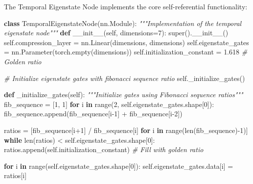 \documentclass[
]{article}
\newenvironment{Shaded}{}{}
\newcommand{\BuiltInTok}[1]{\textcolor[rgb]{0.00,0.50,0.00}{#1}}
\newcommand{\CommentTok}[1]{\textcolor[rgb]{0.38,0.63,0.69}{\textit{#1}}}
\newcommand{\ControlFlowTok}[1]{\textcolor[rgb]{0.00,0.44,0.13}{\textbf{#1}}}
\newcommand{\DecValTok}[1]{\textcolor[rgb]{0.25,0.63,0.44}{#1}}
\newcommand{\FloatTok}[1]{\textcolor[rgb]{0.25,0.63,0.44}{#1}}
\newcommand{\FunctionTok}[1]{\textcolor[rgb]{0.02,0.16,0.49}{#1}}
\newcommand{\KeywordTok}[1]{\textcolor[rgb]{0.00,0.44,0.13}{\textbf{#1}}}
\newcommand{\NormalTok}[1]{#1}
\newcommand{\OperatorTok}[1]{\textcolor[rgb]{0.40,0.40,0.40}{#1}}
\newcommand{\VariableTok}[1]{\textcolor[rgb]{0.10,0.09,0.49}{#1}}
\begin{document}
The Temporal Eigenstate Node implements the core self-referential
functionality:

\begin{Shaded}
\begin{Highlighting}[]
\KeywordTok{class}\NormalTok{ TemporalEigenstateNode(nn.Module):}
    \CommentTok{"""Implementation of the temporal eigenstate node"""}
    \KeywordTok{def} \FunctionTok{\_\_init\_\_}\NormalTok{(}\VariableTok{self}\NormalTok{, dimensions}\OperatorTok{=}\DecValTok{7}\NormalTok{):}
        \BuiltInTok{super}\NormalTok{().}\FunctionTok{\_\_init\_\_}\NormalTok{()}
        \VariableTok{self}\NormalTok{.compression\_layer }\OperatorTok{=}\NormalTok{ nn.Linear(dimensions, dimensions)}
        \VariableTok{self}\NormalTok{.eigenstate\_gates }\OperatorTok{=}\NormalTok{ nn.Parameter(torch.empty(dimensions))}
        \VariableTok{self}\NormalTok{.initialization\_constant }\OperatorTok{=} \FloatTok{1.618}  \CommentTok{\# Golden ratio}

        \CommentTok{\# Initialize eigenstate gates with fibonacci sequence ratio}
        \VariableTok{self}\NormalTok{.\_initialize\_gates()}

    \KeywordTok{def}\NormalTok{ \_initialize\_gates(}\VariableTok{self}\NormalTok{):}
        \CommentTok{"""Initialize gates using Fibonacci sequence ratios"""}
\NormalTok{        fib\_sequence }\OperatorTok{=}\NormalTok{ [}\DecValTok{1}\NormalTok{, }\DecValTok{1}\NormalTok{]}
        \ControlFlowTok{for}\NormalTok{ i }\KeywordTok{in} \BuiltInTok{range}\NormalTok{(}\DecValTok{2}\NormalTok{, }\VariableTok{self}\NormalTok{.eigenstate\_gates.shape[}\DecValTok{0}\NormalTok{]):}
\NormalTok{            fib\_sequence.append(fib\_sequence[i}\OperatorTok{{-}}\DecValTok{1}\NormalTok{] }\OperatorTok{+}\NormalTok{ fib\_sequence[i}\OperatorTok{{-}}\DecValTok{2}\NormalTok{])}

\NormalTok{        ratios }\OperatorTok{=}\NormalTok{ [fib\_sequence[i}\OperatorTok{+}\DecValTok{1}\NormalTok{] }\OperatorTok{/}\NormalTok{ fib\_sequence[i] }\ControlFlowTok{for}\NormalTok{ i }\KeywordTok{in} \BuiltInTok{range}\NormalTok{(}\BuiltInTok{len}\NormalTok{(fib\_sequence)}\OperatorTok{{-}}\DecValTok{1}\NormalTok{)]}
        \ControlFlowTok{while} \BuiltInTok{len}\NormalTok{(ratios) }\OperatorTok{\textless{}} \VariableTok{self}\NormalTok{.eigenstate\_gates.shape[}\DecValTok{0}\NormalTok{]:}
\NormalTok{            ratios.append(}\VariableTok{self}\NormalTok{.initialization\_constant)  }\CommentTok{\# Fill with golden ratio}

        \ControlFlowTok{for}\NormalTok{ i }\KeywordTok{in} \BuiltInTok{range}\NormalTok{(}\VariableTok{self}\NormalTok{.eigenstate\_gates.shape[}\DecValTok{0}\NormalTok{]):}
            \VariableTok{self}\NormalTok{.eigenstate\_gates.data[i] }\OperatorTok{=}\NormalTok{ ratios[i]}


\end{Highlighting}
\end{Shaded}
\end{document}
